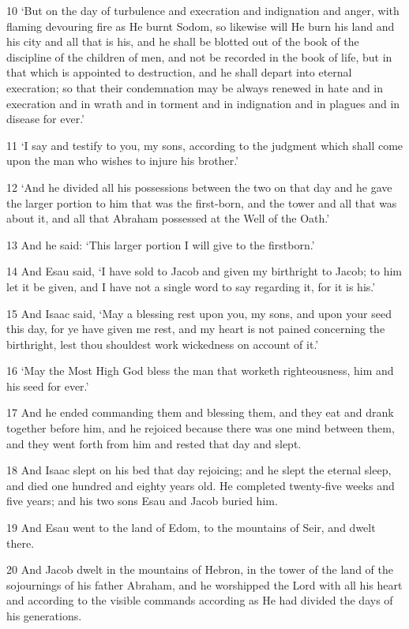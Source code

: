 \par 10 ‘But on the day of turbulence and execration and indignation and anger, with flaming devouring fire as He burnt Sodom, so likewise will He burn his land and his city and all that is his, and he shall be blotted out of the book of the discipline of the children of men, and not be recorded in the book of life, but in that which is appointed to destruction, and he shall depart into eternal execration; so that their condemnation may be always renewed in hate and in execration and in wrath and in torment and in indignation and in plagues and in disease for ever.’
\par 11 ‘I say and testify to you, my sons, according to the judgment which shall come upon the man who wishes to injure his brother.’
\par 12 ‘And he divided all his possessions between the two on that day and he gave the larger portion to him that was the first-born, and the tower and all that was about it, and all that Abraham possessed at the Well of the Oath.’
\par 13 And he said: ‘This larger portion I will give to the firstborn.’
\par 14 And Esau said, ‘I have sold to Jacob and given my birthright to Jacob; to him let it be given, and I have not a single word to say regarding it, for it is his.’
\par 15 And Isaac said, ‘May a blessing rest upon you, my sons, and upon your seed this day, for ye have given me rest, and my heart is not pained concerning the birthright, lest thou shouldest work wickedness on account of it.’
\par 16 ‘May the Most High God bless the man that worketh righteousness, him and his seed for ever.’
\par 17 And he ended commanding them and blessing them, and they eat and drank together before him, and he rejoiced because there was one mind between them, and they went forth from him and rested that day and slept.
\par 18 And Isaac slept on his bed that day rejoicing; and he slept the eternal sleep, and died one hundred and eighty years old. He completed twenty-five weeks and five years; and his two sons Esau and Jacob buried him.
\par 19 And Esau went to the land of Edom, to the mountains of Seir, and dwelt there.
\par 20 And Jacob dwelt in the mountains of Hebron, in the tower of the land of the sojournings of his father Abraham, and he worshipped the Lord with all his heart and according to the visible commands according as He had divided the days of his generations.
